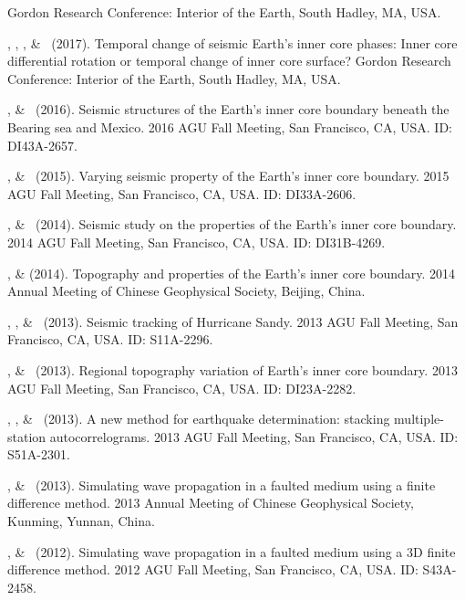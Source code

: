 \begin{etaremune}
    Gordon Research Conference: Interior of the Earth, South Hadley, MA, USA.
\item
    \JYao, \Me, \LSun, \& \LWen\ (2017).
    Temporal change of seismic Earth's inner core phases: Inner core differential rotation or temporal change of inner core surface?
    Gordon Research Conference: Interior of the Earth, South Hadley, MA, USA.
\item
    \Me, \& \LWen\ (2016).
    Seismic structures of the Earth's inner core boundary beneath the Bearing sea and Mexico.
    2016 AGU Fall Meeting, San Francisco, CA, USA. ID: DI43A-2657.
\item
    \Me, \& \LWen\ (2015).
    Varying seismic property of the Earth's inner core boundary.
    2015 AGU Fall Meeting, San Francisco, CA, USA. ID: DI33A-2606.
\item
    \Me, \& \LWen\ (2014).
    Seismic study on the properties of the Earth's inner core boundary.
    2014 AGU Fall Meeting, San Francisco, CA, USA. ID: DI31B-4269.
\item
    \Me, \& \LWen (2014).
    Topography and properties of the Earth's inner core boundary.
    2014 Annual Meeting of Chinese Geophysical Society, Beijing, China.
\item
    \XChen, \Me, \& \LWen\ (2013).
    Seismic tracking of Hurricane Sandy.
    2013 AGU Fall Meeting, San Francisco, CA, USA. ID: S11A-2296.
\item
    \Me, \& \LWen\ (2013).
    Regional topography variation of Earth's inner core boundary.
    2013 AGU Fall Meeting, San Francisco, CA, USA. ID: DI23A-2282.
\item
    \MZhang, \Me, \& \LWen\ (2013).
    A new method for earthquake determination: stacking multiple-station autocorrelograms.
    2013 AGU Fall Meeting, San Francisco, CA, USA. ID: S51A-2301.
\item
    \Me, \& \LWen\ (2013).
    Simulating wave propagation in a faulted medium using a finite difference method.
    2013 Annual Meeting of Chinese Geophysical Society, Kunming, Yunnan, China.
\item
    \Me, \& \LWen\ (2012).
    Simulating wave propagation in a faulted medium using a 3D finite difference method.
    2012 AGU Fall Meeting, San Francisco, CA, USA. ID: S43A-2458.
\end{etaremune}
